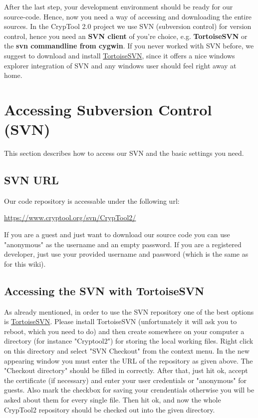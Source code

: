 After the last step, your development environment should be ready for our source-code. Hence, now you need a way of accessing and downloading the entire sources. In the CrypTool 2.0 project we use SVN (subversion control) for version control, hence you need an \textbf{SVN client} of you're choice, e.g. \textbf{TortoiseSVN} or the \textbf{svn commandline from cygwin}. If you never worked with SVN before, we suggest to download and install \href{http://www.tortoisesvn.net/}{TortoiseSVN}, since it offers a nice windows explorer integration of SVN and any windows user should feel right away at home.

\section{Accessing Subversion Control (SVN)}

This section describes how to access our SVN and the basic settings you need.

\subsection*{SVN URL}

Our code repository is accessable under the following url: 

\url{https://www.cryptool.org/svn/CrypTool2/}

If you are a guest and just want to download our source code you can use "anonymous" as the username and an empty password. If you are a registered developer, just use your provided username and password (which is the same as for this wiki).

\subsection*{Accessing the SVN with TortoiseSVN}

As already mentioned, in order to use the SVN repository one of the best options is \href{http://www.tortoisesvn.net/}{TortoiseSVN}. Please install TortoiseSVN (unfortunately it will ask you to reboot, which you need to do) and then create somewhere on your computer a directory (for instance "Cryptool2") for storing the local working files. Right click on this directory and select "SVN Checkout" from the context menu. In the new appearing window you must enter the URL of the repository as given above. The "Checkout directory" should be filled in correctly. After that, just hit ok, accept the certificate (if necessary) and enter your user credentials or "anonymous" for guests. Also mark the checkbox for saving your crendentials otherwise you will be asked about them for every single file. Then hit ok, and now the whole CrypTool2 repository should be checked out into the given directory. 

